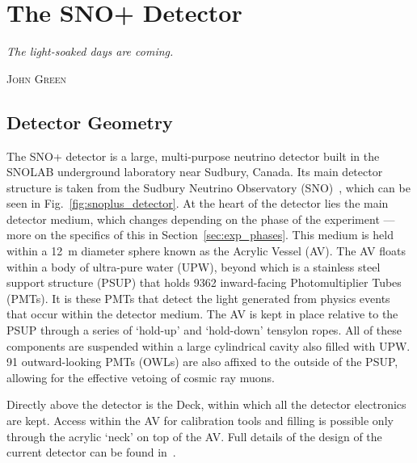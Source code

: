 
\chapter{The SNO+ Detector}\label{chap:detector}
\epigraph{\textit{The light-soaked days are coming.}}{\textsc{John Green}}
\section{Detector Geometry}
The SNO+ detector is a large, multi-purpose neutrino detector built in the SNOLAB underground laboratory near Sudbury, Canada. Its main detector structure is taken from the Sudbury Neutrino Observatory (SNO)~\cite{BOGER2000172}, %
which can be seen in Fig.~\ref{fig:snoplus_detector}. At the heart of the detector lies the main detector medium, which changes depending on the phase of the experiment --- more on the specifics of this in Section~\ref{sec:exp_phases}. This medium is held within a \SI{12}{\metre} diameter sphere known as the Acrylic Vessel (AV). The AV floats within a body of ultra-pure water (UPW), beyond which is a stainless steel support structure (PSUP) that holds 9362 inward-facing Photomultiplier Tubes (PMTs). It is these PMTs that detect the light generated from physics events that occur within the detector medium. The AV is kept in place relative to the PSUP through a series of `hold-up' and `hold-down' tensylon ropes. All of these components are suspended within a large cylindrical cavity also filled with UPW. 91 outward-looking PMTs (OWLs) are also affixed to the outside of the PSUP, allowing for the effective vetoing of cosmic ray muons.

Directly above the detector is the Deck, within which all the detector electronics are kept. Access within the AV for calibration tools and filling is possible only through the acrylic `neck' on top of the AV. Full details of the design of the current detector can be found in~\cite{albaneseSNOExperiment2021}.

